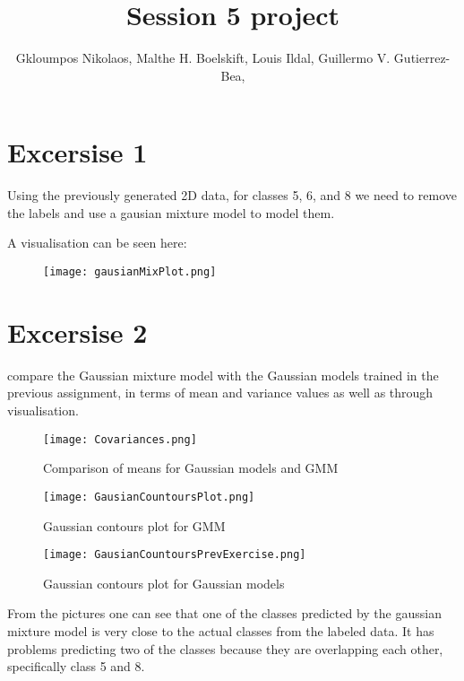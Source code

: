 \documentclass{article}
\title{Session 5 project}
\author {
      Gkloumpos Nikolaos,
      Malthe H. Boelskift,
      Louis Ildal,
      Guillermo V. Gutierrez-Bea,
}
\begin{document}
\maketitle


\section{Excersise 1}
Using the previously generated 2D data, for classes 5, 6, and 8 we need to remove the 
labels and use a gausian mixture model to model them.

A visualisation can be seen here:
\begin{figure}[h]
      \caption{}
      \centering
      \texttt{[image: gausianMixPlot.png]}
\end{figure}   

\section{Excersise 2}
compare the Gaussian mixture model with the Gaussian models trained in the
 previous assignment, in terms of mean and variance values as well as through visualisation.
\begin{figure}[h]
      \caption{Comparison of means for Gaussian models and GMM}
      \centering
      \texttt{[image: Covariances.png]}
\end{figure}     

\begin{figure}[h]
      \caption{Gaussian contours plot for GMM}
      \centering
      \texttt{[image: GausianCountoursPlot.png]}
\end{figure} 

\begin{figure}[h]
      \caption{Gaussian contours plot for Gaussian models}
      \centering
      \texttt{[image: GausianCountoursPrevExercise.png]}
\end{figure} 

From the pictures one can see that one of the classes predicted by the gaussian mixture model is very close to the actual classes from the labeled data. It has problems predicting two of the classes because they are overlapping each other, specifically class 5 and 8. 



\end{document}
